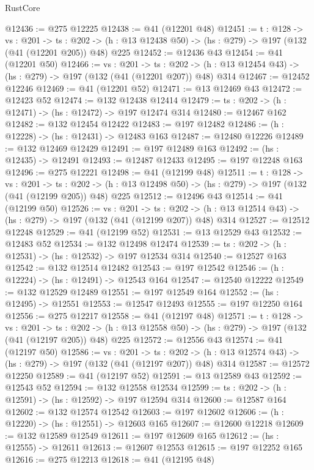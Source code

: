 \begin{lexlean}{RustCore}
\begin{coremodule}
@12436 := @275 @12225
@12438 := @41 (@12201 @48)
@12451 := {t : @128} ->
  {vs : @201} ->
  {ts : @202} -> (h : @13 @12438 @50) -> (hs : @279) -> @197 (@132 (@41 (@12201 @205)) @48) @225
@12452 := @12436 @43
@12454 := @41 (@12201 @50)
@12466 := {vs : @201} ->
  {ts : @202} -> (h : @13 @12454 @43) -> (hs : @279) -> @197 (@132 (@41 (@12201 @207)) @48) @314
@12467 := @12452 @12246
@12469 := @41 (@12201 @52)
@12471 := @13 @12469 @43
@12472 := @12423 @52
@12474 := @132 @12438 @12414
@12479 := {ts : @202} -> (h : @12471) -> (hs : @12472) -> @197 @12474 @314
@12480 := @12467 @162
@12482 := @132 @12454 @12422
@12483 := @197 @12482
@12486 := (h : @12228) -> (hs : @12431) -> @12483 @163
@12487 := @12480 @12226
@12489 := @132 @12469 @12429
@12491 := @197 @12489 @163
@12492 := (hs : @12435) -> @12491
@12493 := @12487 @12433
@12495 := @197 @12248 @163
@12496 := @275 @12221
@12498 := @41 (@12199 @48)
@12511 := {t : @128} ->
  {vs : @201} ->
  {ts : @202} -> (h : @13 @12498 @50) -> (hs : @279) -> @197 (@132 (@41 (@12199 @205)) @48) @225
@12512 := @12496 @43
@12514 := @41 (@12199 @50)
@12526 := {vs : @201} ->
  {ts : @202} -> (h : @13 @12514 @43) -> (hs : @279) -> @197 (@132 (@41 (@12199 @207)) @48) @314
@12527 := @12512 @12248
@12529 := @41 (@12199 @52)
@12531 := @13 @12529 @43
@12532 := @12483 @52
@12534 := @132 @12498 @12474
@12539 := {ts : @202} -> (h : @12531) -> (hs : @12532) -> @197 @12534 @314
@12540 := @12527 @163
@12542 := @132 @12514 @12482
@12543 := @197 @12542
@12546 := (h : @12224) -> (hs : @12491) -> @12543 @164
@12547 := @12540 @12222
@12549 := @132 @12529 @12489
@12551 := @197 @12549 @164
@12552 := (hs : @12495) -> @12551
@12553 := @12547 @12493
@12555 := @197 @12250 @164
@12556 := @275 @12217
@12558 := @41 (@12197 @48)
@12571 := {t : @128} ->
  {vs : @201} ->
  {ts : @202} -> (h : @13 @12558 @50) -> (hs : @279) -> @197 (@132 (@41 (@12197 @205)) @48) @225
@12572 := @12556 @43
@12574 := @41 (@12197 @50)
@12586 := {vs : @201} ->
  {ts : @202} -> (h : @13 @12574 @43) -> (hs : @279) -> @197 (@132 (@41 (@12197 @207)) @48) @314
@12587 := @12572 @12250
@12589 := @41 (@12197 @52)
@12591 := @13 @12589 @43
@12592 := @12543 @52
@12594 := @132 @12558 @12534
@12599 := {ts : @202} -> (h : @12591) -> (hs : @12592) -> @197 @12594 @314
@12600 := @12587 @164
@12602 := @132 @12574 @12542
@12603 := @197 @12602
@12606 := (h : @12220) -> (hs : @12551) -> @12603 @165
@12607 := @12600 @12218
@12609 := @132 @12589 @12549
@12611 := @197 @12609 @165
@12612 := (hs : @12555) -> @12611
@12613 := @12607 @12553
@12615 := @197 @12252 @165
@12616 := @275 @12213
@12618 := @41 (@12195 @48)

\end{coremodule}
\end{lexlean}
